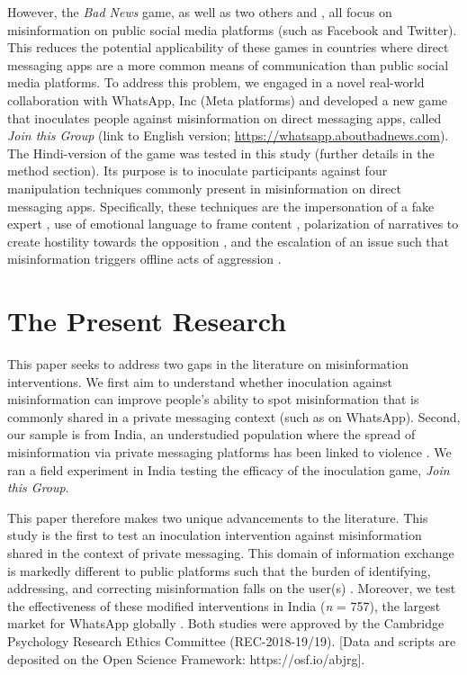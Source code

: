\documentclass[empirical, authordate, issue]{jote-new-article}
\begin{document}
However, the \emph{Bad News }game, as well as two others \parencite[\emph{Harmony Square}][]{Roozenbeek2020} and \parencite[\emph{Go Viral!}][]{Basol2021}, all focus on misinformation on public social media platforms (such as Facebook and Twitter). This reduces the potential applicability of these games in countries where direct messaging apps are a more common means of communication than public social media platforms. To address this problem, we engaged in a novel real-world collaboration with \mbox{WhatsApp}, Inc (Meta platforms) and developed a new game that inoculates people against misinformation on direct messaging apps, called \emph{Join this Group }(link to English version; \url{https://whatsapp.aboutbadnews.com}). The Hindi-version of the game was tested in this study (further details in the method section). Its purpose is to inoculate participants against four manipulation techniques commonly present in misinformation on direct messaging apps. Specifically, these techniques are the impersonation of a fake expert \parencite{Goga2015, Jung2011, Reznik2013}, use of emotional language to frame content \parencite{Gross2004, Konijn2012, Zollo2015}, polarization of narratives to create hostility towards the opposition \parencite{Groenendyk2018, Iyengar2018}, and the escalation of an issue such that misinformation triggers offline acts of aggression \parencite{BBCMonitoring2021, Robb2021}.



\section{The Present Research}

This paper seeks to address two gaps in the literature on misinformation interventions. We first aim to understand whether inoculation against misinformation can improve people's ability to spot misinformation that is commonly shared in a private messaging context (such as on \mbox{WhatsApp}). Second, our sample is from India, an understudied population where the spread of misinformation via private messaging platforms has been linked to violence \parencite{McLaughlin2018}. We ran a field experiment in India testing the efficacy of the inoculation game, \emph{Join this Group}.\textbf{ }

This paper therefore makes two unique advancements to the literature. This study is the first to test an inoculation intervention against misinformation shared in the context of private messaging. This domain of information exchange is markedly different to public platforms such that the burden of identifying, addressing, and correcting misinformation falls on the user(s) \parencite{Pasquetto2020}. Moreover, we test the effectiveness of these modified interventions in India (\emph{n} = 757), the largest market for \mbox{WhatsApp} globally \parencite{Findlay2019}. Both studies were approved by the Cambridge Psychology Research Ethics Committee (REC-2018-19/19). [Data and scripts are deposited on the Open Science Framework: https://osf.io/abjrg].
\end{document}
